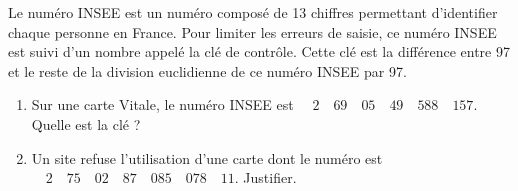 
Le numéro INSEE est un numéro composé de 13 chiffres permettant d'identifier chaque personne en France. Pour limiter les erreurs de saisie, ce numéro INSEE est suivi d'un nombre appelé la clé de contrôle. Cette clé est la différence entre 97 et le reste de la division euclidienne de ce numéro INSEE par 97. 
\begin{enumerate}
\item Sur une carte Vitale, le numéro INSEE est $\quad 2 \quad 69 \quad 05 \quad 49 \quad 588 \quad 157$. Quelle est la clé ?
\item Un site refuse l'utilisation d'une carte dont le numéro est  $\quad 2 \quad 75 \quad 02 \quad 87 \quad 085 \quad 078 \quad 11$. Justifier.
\end{enumerate}